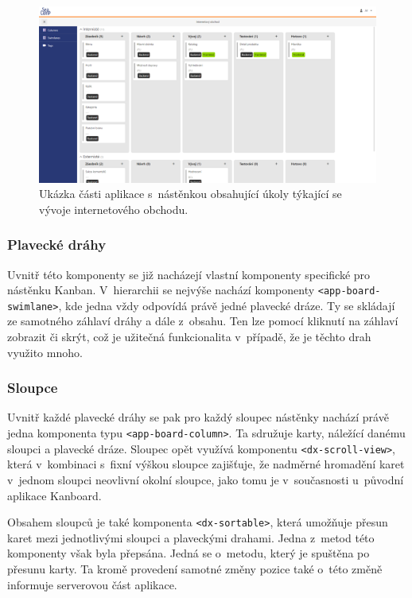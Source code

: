 \begin{figure}[H]
	\centering
	\label{img:board}
	\includegraphics[width=\textwidth]{obrazky-figures/board.png}
	\caption{Ukázka části aplikace s~nástěnkou obsahující úkoly týkající se vývoje internetového obchodu.}
\end{figure}

\subsubsection*{Plavecké dráhy}

Uvnitř této komponenty se již nacházejí vlastní komponenty specifické pro nástěnku Kanban. V~hierarchii se nejvýše nachází komponenty \texttt{<app-board-swimlane>}, kde jedna vždy odpovídá právě jedné plavecké dráze. Ty se skládají ze samotného záhlaví dráhy a dále z~obsahu. Ten lze pomocí kliknutí na záhlaví zobrazit či skrýt, což je užitečná funkcionalita v~případě, že je těchto drah využito mnoho. 

\subsubsection*{Sloupce}

Uvnitř každé plavecké dráhy se pak pro každý sloupec nástěnky nachází právě jedna komponenta typu \texttt{<app-board-column>}. Ta sdružuje karty, náležící danému sloupci a plavecké dráze. Sloupec opět využívá komponentu \texttt{<dx-scroll-view>}, která v~kombinaci s~fixní výškou sloupce zajišťuje, že nadměrné hromadění karet v~jednom sloupci neovlivní okolní sloupce, jako tomu je v~současnosti u~původní aplikace Kanboard.

Obsahem sloupců je také komponenta \texttt{<dx-sortable>}, která umožňuje přesun karet mezi jednotlivými sloupci a plaveckými drahami. Jedna z~metod této komponenty však byla přepsána. Jedná se o~metodu, který je spuštěna po přesunu karty. Ta kromě provedení samotné změny pozice také o~této změně informuje serverovou část aplikace. 

